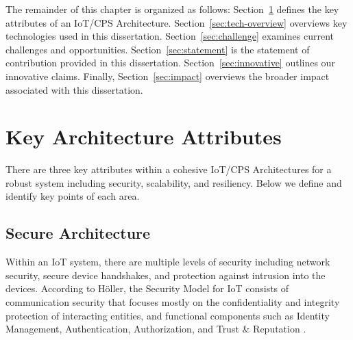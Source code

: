 \documentclass[../main.tex]{subfiles}
\begin{document}

The remainder of this chapter is organized as follows: Section~\ref{sec:key-attributes} defines the key attributes of an IoT/CPS Architecture. Section~\ref{sec:tech-overview} overviews key technologies used in this dissertation. Section~\ref{sec:challenge} examines current challenges and opportunities. Section~\ref{sec:statement} is the statement of contribution provided in this dissertation. Section~\ref{sec:innovative} outlines our innovative claims. Finally, Section~\ref{sec:impact} overviews the broader impact associated with this dissertation.



\section{Key Architecture Attributes}
\label{sec:key-attributes}

There are three key attributes within a cohesive IoT/CPS Architectures for a robust system including security, scalability, and resiliency. Below we define and identify key points of each area. 

\subsection{Secure Architecture}
Within an IoT system, there are multiple levels of security including network security, secure device handshakes, and protection against intrusion into the devices. According to H\"oller, the Security Model for IoT consists of communication security that focuses mostly on the confidentiality and integrity protection of interacting entities, and functional components such as Identity Management, Authentication, Authorization, and Trust \& Reputation \cite{m2m_iot}.
\end{document}

